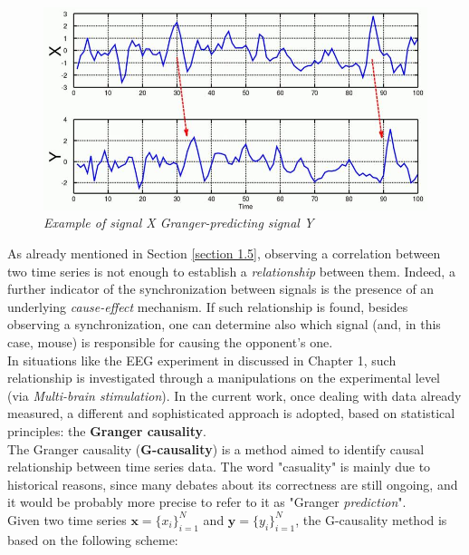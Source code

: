 \documentclass[12pt, a4paper]{report}
\begin{document}
\begin{figure}[H]
	\begin{center}
		\hspace*{-1cm}
		\includegraphics[scale=.65]{GC.png} 
	\end{center} 
	\caption{\textit{Example of signal X Granger-predicting signal Y }} 
	
\end{figure}

As already mentioned in Section \ref{section 1.5}, observing a correlation between two time series 
is not enough to establish a \textit{relationship} between them. Indeed, a further indicator of  the synchronization between signals is the presence of an underlying \textit{cause-effect} mechanism. If such relationship is found, besides observing a synchronization, one can determine also which signal (and, in this case, mouse) is responsible for causing the opponent's one.\\
In situations like the EEG experiment in \cite{15} %
 discussed in Chapter 1, such relationship is investigated through a manipulations on the experimental level (via \textit{Multi-brain stimulation}). In  the current work, once dealing with data already measured, a different and sophisticated approach is adopted, based on statistical principles: the \textbf{Granger causality}.\\
The Granger causality (\textbf{G-causality}) is a method aimed to identify causal relationship between time series data. The word "casuality" is mainly due to historical reasons, since many debates about its correctness are still ongoing, and it would be probably more precise to refer to it as "Granger \textit{prediction}".
\\

Given two time series $ \textbf{x} = \{x_i\}_{i=1}^N$ and  $\textbf{y} = \{y_i\}_{i=1}^N$, the G-causality method is based on the following scheme:
\end{document}
